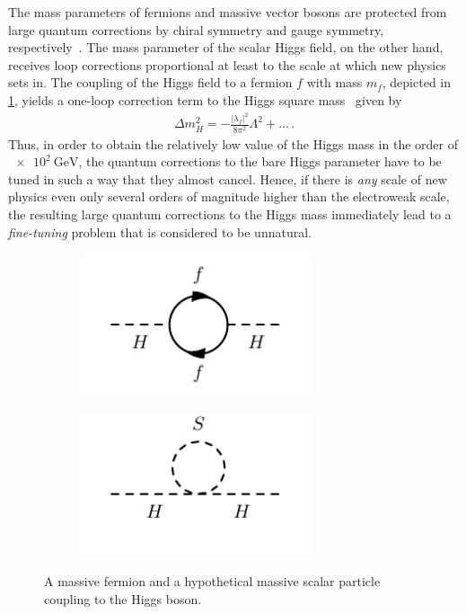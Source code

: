 The mass parameters of fermions and massive vector bosons are protected from large quantum corrections by chiral symmetry and gauge symmetry, respectively~\cite{Aitchison:2007fn}. The mass parameter of the scalar Higgs field, on the other hand, receives loop corrections proportional at least to the scale at which new physics sets in. The coupling of the Higgs field to a fermion $f$ with mass $m_f$, depicted in \cref{fig:fermion_loop}, yields a one-loop correction term to the Higgs square mass~\cite{Martin:1997ns} given by
\begin{align}
	\Delta m_H^2 = -\frac{\lvert\lambda_f\rvert^2}{8\pi^2} \Lambda^2 + \dots\, .
	\label{eq:fermion_correction}
\end{align}
Thus, in order to obtain the relatively low value of the Higgs mass in the order of $\SI{e2}{\GeV}$, the quantum corrections to the bare Higgs parameter have to be tuned in such a way that they almost cancel.  Hence, if there is \textit{any} scale of new physics even only several orders of magnitude higher than the electroweak scale, the resulting large quantum corrections to the Higgs mass immediately lead to a \textit{fine-tuning} problem that is considered to be unnatural.

\begin{figure}
	\centering
	\begin{subfigure}[b]{0.5\linewidth}
		\centering\includegraphics[width=0.75\textwidth]{fermion_loop}
		\caption{\label{fig:fermion_loop}}
	\end{subfigure}%
	\begin{subfigure}[b]{0.5\linewidth}
		\centering\includegraphics[width=0.75\textwidth]{scalar_loop}
		\caption{\label{fig:scal_loop}}
	\end{subfigure}	
	\caption{A massive fermion  and a hypothetical massive scalar particle  coupling to the Higgs boson.}\label{fig:loop_corrections_higgs}
\end{figure}

